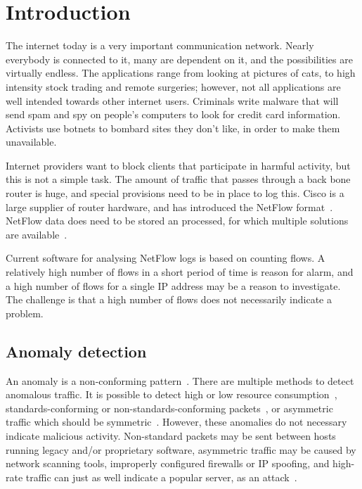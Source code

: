 \chapter{Introduction}
\label{chp:introduction} 

The internet today is a very important communication network.
Nearly everybody is connected to it, many are dependent on it,
 and the possibilities are virtually endless.
The applications range from looking at pictures of cats, to high intensity stock trading and remote surgeries;
however, not all applications are well intended towards other internet users.
Criminals write malware that will send spam and spy on people's computers to look for credit card information.
Activists use botnets to bombard sites they don't like, in order to make them unavailable.

Internet providers want to block clients that participate in harmful activity,
 but this is not a simple task.
The amount of traffic that passes through a back bone router is huge,
 and special provisions need to be in place to log this.
Cisco is a large supplier of router hardware, and has introduced the NetFlow format~\cite{cisco0netflow}.
NetFlow data does need to be stored an processed, for which multiple solutions are available~\cite{zaharia2010spark,Morken352472}.

Current software for analysing NetFlow logs is based on counting flows.
A relatively high number of flows in a short period of time is reason for alarm,
 and a high number of flows for a single IP address may be a reason to investigate.
The challenge is that a high number of flows does not necessarily indicate a problem.


\section{Anomaly detection}
An anomaly is a non-conforming pattern~\cite{Chandola:2009:ADS:1541880.1541882}.
There are multiple methods to detect anomalous traffic.
It is possible to detect high or low resource consumption~\cite{lan2003effect}, standards-conforming or non-standards-conforming packets~\cite{john2008detection}, or asymmetric traffic which should be symmetric~\cite{kreibich2005using}.
However, these anomalies do not necessary indicate malicious activity.
Non-standard packets may be sent between hosts running legacy and/or proprietary software,
asymmetric traffic may be caused by network scanning tools, improperly configured firewalls or IP spoofing,
and high-rate traffic can just as well indicate a popular server, as an attack~\cite{gao2006differentiating}.

